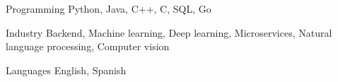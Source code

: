 
\begin{cvskills}
  \cvskill
    {Programming} %
    {Python, Java, C++, C, SQL, Go} %

  \cvskill
  {Industry}
  {Backend, Machine learning, Deep learning, Microservices, Natural language processing, Computer vision }

    
  \cvskill
    {Languages} 
    {English, Spanish}
\end{cvskills}
